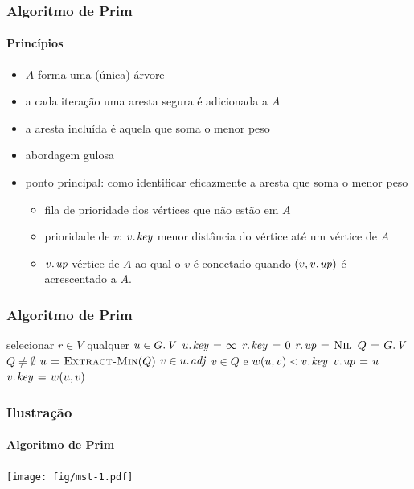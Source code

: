 \documentclass{beamer}
\begin{document}
\begin{frame}
\frametitle{Algoritmo de Prim}
\framesubtitle{Princípios}

\begin{itemize}
\item $A$ forma uma (única) árvore
\item a cada iteração uma aresta segura é adicionada a $A$
\item a aresta incluída é aquela que soma o menor peso
\item abordagem gulosa
\item ponto principal: como identificar eficazmente a aresta que soma o menor peso
\begin{itemize}
\item fila de prioridade dos vértices que não estão em $A$
\item prioridade de $v$: $\attrib{v}{key}$ menor distância do vértice até um vértice de $A$
\item $\attrib{v}{up}$ vértice de $A$ ao qual o $v$ é conectado quando
  $(v,\attrib{v}{up})$ é acrescentado a $A$.
\end{itemize}
\end{itemize}

\end{frame}

\begin{frame}
\frametitle{Algoritmo de Prim}

\begin{codebox}
\li selecionar $r \in V$ qualquer
\li \For $u \in \attrib{G}{V}$
\li \Do $\attrib{u}{key} \gets \infty$
    \End
\li $\attrib{r}{key} \gets 0$
\li $\attrib{r}{up} \gets \const{Nil}$
\li $Q \gets \attrib{G}{V}$
\li \While $Q \neq \emptyset$
\li \Do $u \mathrel{\hspace{1pt}=\hspace{1pt}} \textnormal{\scshape Extract-Min}(Q)$
\li   \For $v \in \attrib{u}{adj}$
\li   \Do \If $v \in Q$ e $w(u, v) < \attrib{v}{key}$
\li     \Then $\attrib{v}{up} \gets u$
\li       $\attrib{v}{key} \gets w(u, v)$
        \End
      \End
    \End
\end{codebox}

\end{frame}

\begin{frame}
\frametitle{Ilustração}
\framesubtitle{Algoritmo de Prim}

\begin{center}
\texttt{[image: fig/mst-1.pdf]}
\end{center}

\end{frame}
\end{document}
